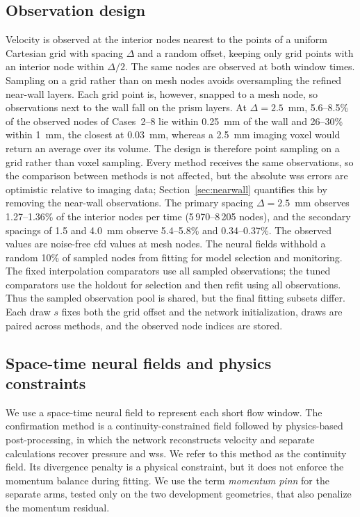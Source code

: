 \documentclass[12pt,a4paper]{article}
\newcommand{\CFD}{\ac{cfd}\xspace}
\newcommand{\PINN}{\ac{pinn}\xspace}
\newcommand{\WSS}{\ac{wss}\xspace}
\theoremstyle{definition}
\numberwithin{equation}{section}
\begin{document}
\subsection{Observation design}
\label{sec:observations}
Velocity is observed at the interior nodes nearest to the points of a uniform Cartesian grid with spacing $\Delta$ and a random offset, keeping only grid points with an interior node within $\Delta/2$. The same nodes are observed at both window times. Sampling on a grid rather than on mesh nodes avoids oversampling the refined near-wall layers. Each grid point is, however, snapped to a mesh node, so observations next to the wall fall on the prism layers. At $\Delta=2.5$~mm, 5.6--8.5\% of the observed nodes of Cases~2--8 lie within 0.25~mm of the wall and 26--30\% within 1~mm, the closest at 0.03~mm, whereas a 2.5~mm imaging voxel would return an average over its volume. The design is therefore point sampling on a grid rather than voxel sampling. Every method receives the same observations, so the comparison between methods is not affected, but the absolute \WSS errors are optimistic relative to imaging data; Section~\ref{sec:nearwall} quantifies this by removing the near-wall observations. The primary spacing $\Delta=2.5$~mm observes 1.27--1.36\% of the interior nodes per time (5\,970--8\,205 nodes), and the secondary spacings of 1.5 and 4.0~mm observe 5.4--5.8\% and 0.34--0.37\%. The observed values are noise-free \CFD values at mesh nodes. The neural fields withhold a random 10\% of sampled nodes from fitting for model selection and monitoring. The fixed interpolation comparators use all sampled observations; the tuned comparators use the holdout for selection and then refit using all observations. Thus the sampled observation pool is shared, but the final fitting subsets differ. Each draw $s$ fixes both the grid offset and the network initialization, draws are paired across methods, and the observed node indices are stored.


\subsection{Space-time neural fields and physics constraints}
\label{sec:field}
We use a space-time neural field to represent each short flow window. The confirmation method is a continuity-constrained field followed by physics-based post-processing, in which the network reconstructs velocity and separate calculations recover pressure and \WSS. We refer to this method as the continuity field. Its divergence penalty is a physical constraint, but it does not enforce the momentum balance during fitting. We use the term \emph{momentum \PINN} for the separate arms, tested only on the two development geometries, that also penalize the momentum residual. 
\end{document}

